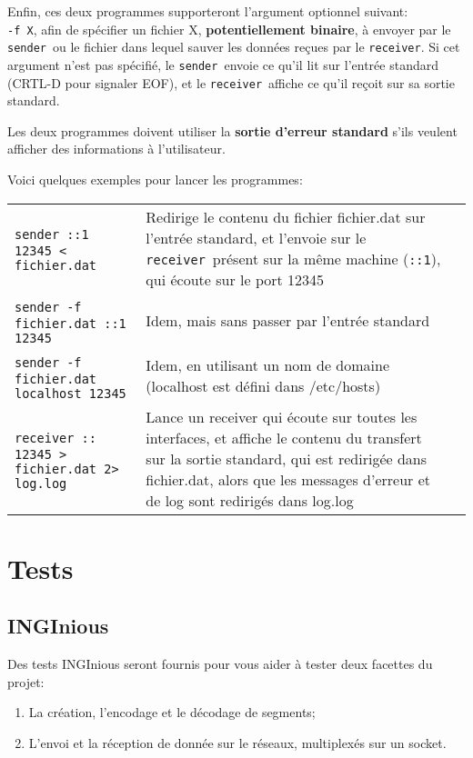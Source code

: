 \documentclass[a4paper,12pt]{article}
\newcommand{\sender}{\texttt{sender}}
\newcommand{\receiver}{\texttt{receiver}}
\begin{document}
Enfin, ces deux programmes supporteront l'argument optionnel suivant:\\
\texttt{-f X}, afin de spécifier un fichier X, \textbf{potentiellement binaire}, à envoyer par le \sender\
ou le fichier dans lequel sauver les données reçues par le \receiver.
Si cet argument n'est pas spécifié, le \sender\ envoie ce qu'il lit sur l'entrée
standard (CRTL-D pour signaler EOF), et le \receiver\ affiche ce qu'il reçoit sur
sa sortie standard.

Les deux programmes doivent utiliser la \textbf{sortie d'erreur standard} s'ils veulent afficher
des informations à l'utilisateur.

\medskip
Voici quelques exemples pour lancer les programmes:\\
\begin{tabular}{lp{}l}
    \sender\ \texttt{::1 12345 <{} fichier.dat} & Redirige le contenu du fichier fichier.dat
                                       sur l'entrée standard, et l'envoie sur le
                                       \receiver\ présent sur la même machine
                                       (\texttt{::1}),
                                       qui écoute sur le port 12345 \\
    \sender\ \texttt{-f fichier.dat ::1 12345} & Idem, mais sans passer par l'entrée standard\\
    \sender\ \texttt{-f fichier.dat localhost 12345} &
    Idem, en utilisant un nom de domaine (localhost est défini dans
    /etc/hosts)\\
    \receiver\ \texttt{:: 12345 > fichier.dat 2> log.log} & Lance un receiver qui écoute sur toutes
                                       les interfaces, et affiche le contenu du transfert sur
                                       la sortie standard, qui est redirigée dans fichier.dat, alors
                                       que les messages d'erreur et de log sont redirigés dans
                                       log.log\\
\end{tabular}

\section{Tests}
\subsection{INGInious}
Des tests INGInious seront fournis pour vous aider à tester deux facettes du
projet:
\begin{enumerate}
    \item La création, l'encodage et le décodage de segments;
    \item L'envoi et la réception de donnée sur le réseaux, multiplexés sur un
        socket.
\end{enumerate}
\end{document}
